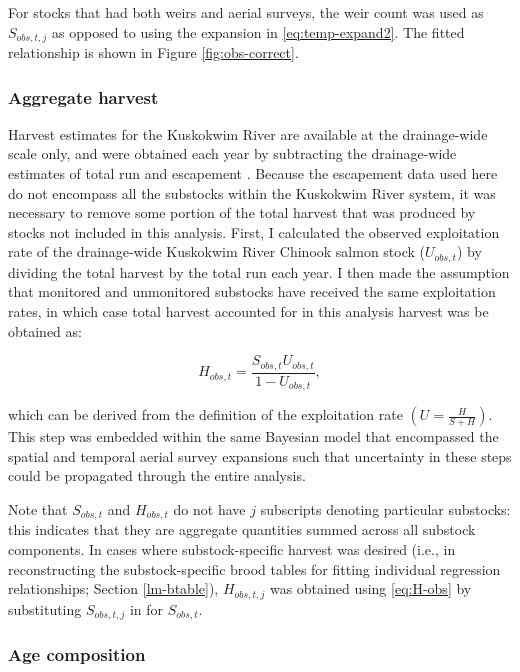 \documentclass[12pt,]{book}
\theoremstyle{definition}
\theoremstyle{definition}
\theoremstyle{definition}
\theoremstyle{remark}
\begin{document}
\noindent
For stocks that had both weirs and aerial surveys, the weir count was
used as \(S_{obs,t,j}\) as opposed to using the expansion in
\eqref{eq:temp-expand2}. The fitted relationship is shown in Figure
\ref{fig:obs-correct}.

\subsubsection{Aggregate harvest}\label{harv-expansion}

\noindent
Harvest estimates for the Kuskokwim River are available at the
drainage-wide scale only, and were obtained each year by subtracting the
drainage-wide estimates of total run and escapement
\citep{liller-etal-2018}. Because the escapement data used here do not
encompass all the substocks within the Kuskokwim River system, it was
necessary to remove some portion of the total harvest that was produced
by stocks not included in this analysis. First, I calculated the
observed exploitation rate of the drainage-wide Kuskokwim River Chinook
salmon stock (\(U_{obs,t}\)) by dividing the total harvest by the total
run each year. I then made the assumption that monitored and unmonitored
substocks have received the same exploitation rates, in which case total
harvest accounted for in this analysis harvest was be obtained as:

\begin{equation}
  H_{obs,t} = \frac{S_{obs,t} U_{obs,t}}{1-U_{obs,t}},
  \label{eq:H-obs}
\end{equation}

\noindent
which can be derived from the definition of the exploitation rate
\(\left(U = \frac{H}{S+H}\right)\). This step was embedded within the
same Bayesian model that encompassed the spatial and temporal aerial
survey expansions such that uncertainty in these steps could be
propagated through the entire analysis.

Note that \(S_{obs,t}\) and \(H_{obs,t}\) do not have \(j\) subscripts
denoting particular substocks: this indicates that they are aggregate
quantities summed across all substock components. In cases where
substock-specific harvest was desired (i.e., in reconstructing the
substock-specific brood tables for fitting individual regression
relationships; Section \ref{lm-btable}), \(H_{obs,t,j}\) was obtained
using \eqref{eq:H-obs} by substituting \(S_{obs,t,j}\) in for
\(S_{obs,t}\).

\subsubsection{Age composition}\label{age-comp}
\end{document}
